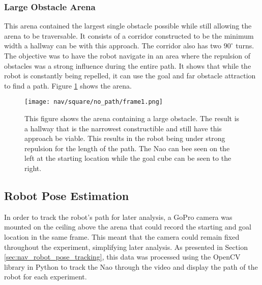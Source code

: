 \subsubsection{Large Obstacle Arena}
This arena contained the largest single obstacle possible while still allowing the arena
to be traversable. It consists of a corridor constructed to be the minimum width
a hallway can be with this approach. The corridor also has two $90^\circ$ turns.
The objective was to have the robot navigate in an area where the repulsion of obstacles
was a strong influence during the entire path. It shows that while the robot is constantly being
repelled, it can use the goal and far obstacle attraction to find a path.
Figure \ref{fig:nav_square_setup1} shows the arena.

\begin{figure}
  \texttt{[image: nav/square/no\_path/frame1.png]}
  \caption{This figure shows the arena containing a large obstacle. The result is a hallway
           that is the narrowest constructible and still have this approach be viable. This results
           in the robot being under strong repulsion for the length of the path.
           The Nao can bee seen on the left at the starting location
           while the goal cube can be seen to the right.}
  \label{fig:nav_square_setup1}
\end{figure}

\FloatBarrier
\subsection{Robot Pose Estimation} \label{subsec:robot_pose_est}
In order to track the robot's path for later analysis, a GoPro camera
was mounted on the ceiling above the arena that could record the starting and goal
location in the same frame. This meant that the camera could remain fixed throughout the
experiment, simplifying later analysis.
As presented in Section \ref{sec:nav_robot_pose_tracking}, this data was processed
using the OpenCV library in Python to track the Nao through the video and display
the path of the robot for each experiment.
 


